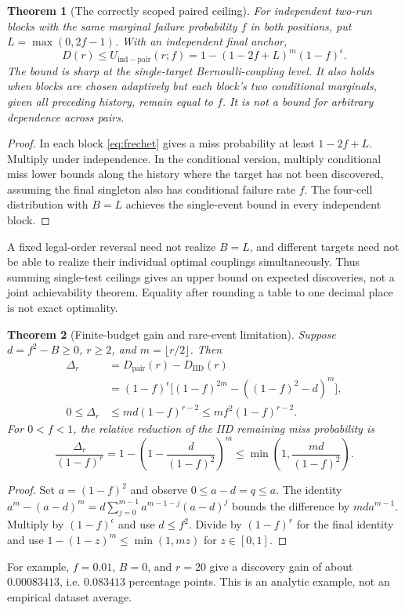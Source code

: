 \documentclass[11pt,a4paper]{article}
\newtheorem{theorem}{Theorem}[section]
\theoremstyle{definition}\newtheorem{definition}[theorem]{Definition}
\theoremstyle{remark}\newtheorem{remark}[theorem]{Remark}
\newcommand{\IID}{\mathrm{IID}}
\newcommand{\PAIR}{\mathrm{pair}}
\theoremstyle{definition}\newtheorem{xexample}[xtheorem]{Example}\theoremstyle{plain}
\begin{document}
\begin{theorem}[The correctly scoped paired ceiling]\label{thm:ceiling}
For independent two-run blocks with the same marginal failure probability $f$ in both positions, put $L=\max(0,2f-1)$. With an independent final anchor,
\begin{equation}\label{eq:ceiling}
 D(r)\le U_{\mathrm{ind-pair}}(r;f)
 =1-(1-2f+L)^m(1-f)^\epsilon.
\end{equation}
The bound is sharp at the single-target Bernoulli-coupling level. It also holds when blocks are chosen adaptively but each block's two conditional marginals, given all preceding history, remain equal to $f$. It is not a bound for arbitrary dependence across pairs.
\end{theorem}
\begin{proof}
In each block \eqref{eq:frechet} gives a miss probability at least $1-2f+L$. Multiply under independence. In the conditional version, multiply conditional miss lower bounds along the history where the target has not been discovered, assuming the final singleton also has conditional failure rate $f$. The four-cell distribution with $B=L$ achieves the single-event bound in every independent block.
\end{proof}
A fixed legal-order reversal need not realize $B=L$, and different targets need not be able to realize their individual optimal couplings simultaneously. Thus summing single-test ceilings gives an upper bound on expected discoveries, not a joint achievability theorem. Equality after rounding a table to one decimal place is not exact optimality.

\begin{theorem}[Finite-budget gain and rare-event limitation]\label{thm:gain}
Suppose $d=f^2-B\ge0$, $r\ge2$, and $m=\lfloor r/2\rfloor$. Then
\begin{align}
 \Delta_r&=D_{\PAIR}(r)-D_{\IID}(r)\\
 &= (1-f)^\epsilon\bigl[(1-f)^{2m}-((1-f)^2-d)^m\bigr],\label{eq:gain}\\
 0\le\Delta_r&\le m d(1-f)^{r-2}\le m f^2(1-f)^{r-2}.\label{eq:gainbound}
\end{align}
For $0<f<1$, the relative reduction of the IID remaining miss probability is
\[
 \frac{\Delta_r}{(1-f)^r}
 =1-\left(1-\frac{d}{(1-f)^2}\right)^m
 \le\min\left(1,\frac{m d}{(1-f)^2}\right).
\]
\end{theorem}
\begin{proof}
Set $a=(1-f)^2$ and observe $0\le a-d=q\le a$. The identity
$a^m-(a-d)^m=d\sum_{j=0}^{m-1}a^{m-1-j}(a-d)^j$
bounds the difference by $mda^{m-1}$. Multiply by $(1-f)^\epsilon$ and use $d\le f^2$. Divide by $(1-f)^r$ for the final identity and use $1-(1-z)^m\le\min(1,mz)$ for $z\in[0,1]$.
\end{proof}
For example, $f=0.01$, $B=0$, and $r=20$ give a discovery gain of about $0.00083413$, i.e. $0.083413$ percentage points. This is an analytic example, not an empirical dataset average.
\end{document}
